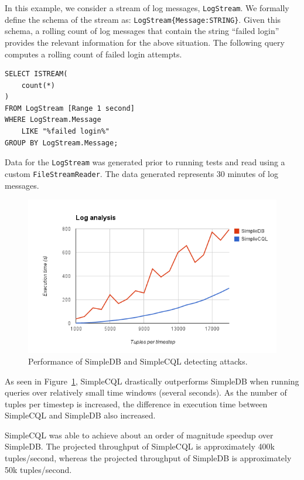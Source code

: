 \documentclass[a4paper, 10pt, conference]{IEEEconf}
\begin{document}
In this example, we consider a stream of log messages, \texttt{LogStream}. We formally define the schema of the stream as: \texttt{LogStream\{Message:STRING\}}. Given this schema, a rolling count of log messages that contain the string ``failed login'' provides the relevant information for the above situation.  The following query computes a rolling count of failed login attempts.

\begin{lstlisting}
SELECT ISTREAM(
    count(*)
)
FROM LogStream [Range 1 second]
WHERE LogStream.Message
	LIKE "%failed login%"
GROUP BY LogStream.Message;
\end{lstlisting}

Data for the \texttt{LogStream} was generated prior to running tests and read using a custom \texttt{FileStreamReader}.  The data generated represents 30 minutes of log messages.

\begin{figure}[h!]
    \centering
    \centerline{\includegraphics[totalheight=5cm]{attack.png}}
    \caption{Performance of SimpleDB and SimpleCQL detecting attacks.}
    \label{fig:attack}
\end{figure}

As seen in Figure~\ref{fig:attack}, SimpleCQL drastically outperforms SimpleDB when running queries over relatively small time windows (several seconds).  As the number of tuples per timestep is increased, the difference in execution time between SimpleCQL and SimpleDB also increased.  

SimpleCQL was able to achieve about an order of magnitude speedup over SimpleDB.  The projected throughput of SimpleCQL is approximately 400k tuples/second, whereas the projected throughput of SimpleDB is approximately 50k tuples/second.
\end{document}
